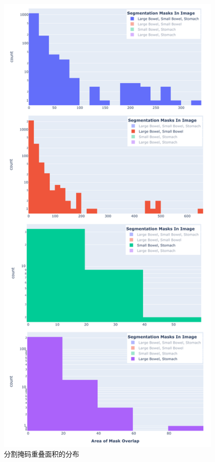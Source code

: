 \documentclass[letterpaper, 10pt, conference, twoside]{ieeeconf}
\begin{document}
\begin{figure}[htbp]
  \centering
  \includegraphics[width = 1\linewidth]{seg_overlay_distribution.png}
  \caption{分割掩码重叠面积的分布}
  \label{fig:fig12}
\end{figure}
\end{document}
